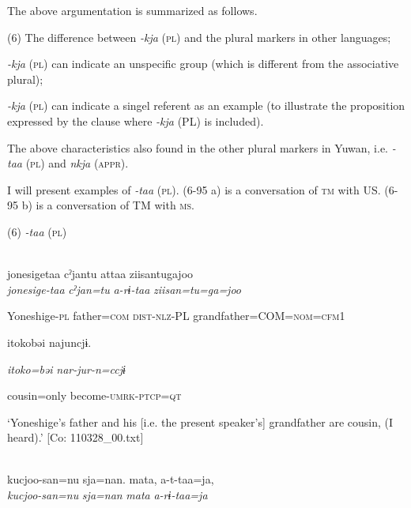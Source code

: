 The above argumentation is summarized as follows.

(6)  The difference between \textit{{}-kja} (\textsc{pl}) and the plural markers in other languages;

 \ea \textit{{}-kja} (\textsc{pl}) can indicate an unspecific group (which is different from the associative plural);\\
\gll

 \ex \textit{{}-kja} (\textsc{pl}) can indicate a singel referent as an example (to illustrate the proposition expressed by the clause where \textit{{}-kja} (PL) is included).\\
\gll

The above characteristics also found in the other plural markers in Yuwan, i.e. \textit{{}-taa} (\textsc{pl}) and \textit{nkja} (\textsc{appr}).

I will present examples of \textit{{}-taa} (\textsc{pl}). (6-95 a) is a conversation of \textsc{tm} with US. (6-95 b) is a conversation of TM with \textsc{ms}.

(6)  \textit{{}-taa} (\textsc{pl})

 \ea{}\\
\gll  {\TM}  jonesigetaa  cˀjantu  attaa  ziisantugajoo\\

      \textit{jonesige-taa}  \textit{cˀjan=tu}  \textit{a-rɨ-taa}  \textit{ziisan=tu=ga=joo}

      Yoneshige-\textsc{pl}  father=\textsc{com}  \textsc{dist}-\textsc{nlz}-PL  grandfather=COM=\textsc{nom}=\textsc{cfm}1

      {\textbar}itoko{\textbar}bəi  najuncjɨ.

      \textit{itoko=bəi}  \textit{nar-jur-n=ccjɨ}

      cousin=only  become-\textsc{umrk}-\textsc{ptcp}=\textsc{qt}

\glt ‘Yoneshige’s father and his [i.e. the present speaker’s] grandfather are cousin, (I heard).’ [Co: 110328\_00.txt]
\z

 \ex{}\\
{\TM}
\gll  kucjoo-san=nu  sja=nan.  mata,  a-t-taa=ja,\\

      \textit{kucjoo-san=nu}  \textit{sja=nan}  \textit{mata}  \textit{a-rɨ-taa=ja}

